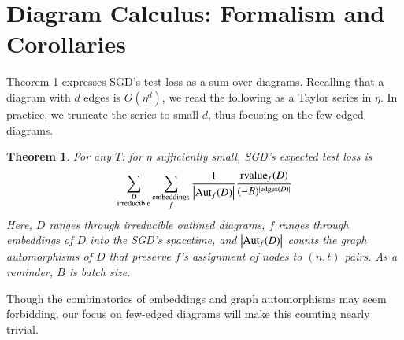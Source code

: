 \documentclass{article}
\theoremstyle{plain}
\newtheorem{thm}{Theorem}
\theoremstyle{definition}
\newcommand{\wabs}[1]{\left|#1\right|}
\newcommand{\Aut}{\text{\textnormal{Aut}}}
\newcommand{\rvalue}{\text{\textnormal{rvalue}}}
\newcommand{\edges}{\text{\textnormal{edges}}}
\begin{document}

\section{Diagram Calculus: Formalism and Corollaries} \label{sect:calculus}

               
        Theorem \ref{thm:resum} expresses SGD's test loss as a sum over
        diagrams.  Recalling that a diagram with $d$ edges is $O(\eta^d)$, we
        read the following as a Taylor series in $\eta$.  In
        practice, we truncate the series to small $d$, thus focusing on the
        few-edged diagrams.
        \begin{thm} \label{thm:resum}
            For any $T$: for $\eta$ sufficiently small, SGD's expected test
            loss is
            \begin{equation*} \label{eq:resum}
                \sum_{\substack{D \\ \text{irreducible}}}
                \sum_{\substack{\text{embeddings} \\ f}}
                \frac{1}{\wabs{\Aut_f(D)}}
                \frac{{\rvalue_f}(D)}{(-B)^{|\edges(D)|}}
            \end{equation*}
            Here, $D$ ranges through irreducible outlined diagrams,
            $f$ ranges through embeddings of $D$ into
            the SGD's spacetime, and $\wabs{\Aut_f(D)}$ counts the graph
            automorphisms of $D$ that preserve $f$'s assignment of nodes to
            $(n,t)$ pairs.  As a reminder, $B$ is batch size.
        \end{thm}
        Though the combinatorics of embeddings and graph automorphisms may seem
        forbidding, our focus on few-edged diagrams will make this counting
        nearly trivial.

 
\end{document}
